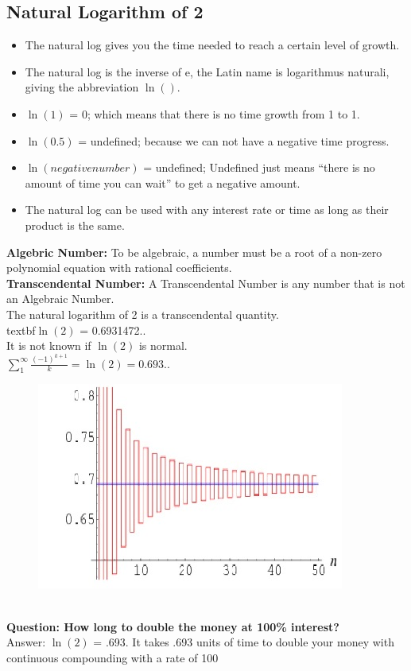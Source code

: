 \documentclass{article}
\begin{document}
\subsection{Natural Logarithm of 2}
\noindent
\begin{itemize}
    \item The natural log gives you the time needed to reach a certain level of growth.
    \item The natural log is the inverse of e, the Latin name is logarithmus naturali, giving the abbreviation $\ln()$.
    \item $\ln(1)$ = 0; which means that there is no time growth from 1 to 1.
    \item $\ln(0.5)$ = undefined; because we can not have a negative time progress.
    \item $\ln(negative number)$ = undefined; Undefined just means “there is no amount of time you can wait” to get a negative amount.
    \item The natural log can be used with any interest rate or time as long as their product is the same.
\end{itemize}
\textbf{Algebric Number:} To be algebraic, a number must be a root of a non-zero polynomial equation with rational coefficients.\\
\textbf{Transcendental Number:} A Transcendental Number is any number that is not an Algebraic Number.\\
The natural logarithm of 2 is a transcendental quantity.
\\textbf{$\ln(2)$} = 0.6931472.. \\
It is not known if $\ln(2)$ is normal.\\ 
$\sum_1^\infty{\frac{(-1)^{k+1}}{k}} = \ln(2) = 0.693..$
\begin{figure}[h!]
    \centering
    \includegraphics{Natural_Log_Of_2.jpg}
\end{figure}
\\
\textbf{Question: How long to double the money at 100\% interest?} \\
Answer: $\ln(2)$ = .693. It takes .693 units of time to double your money with continuous compounding with a rate of 100%
\end{document}
